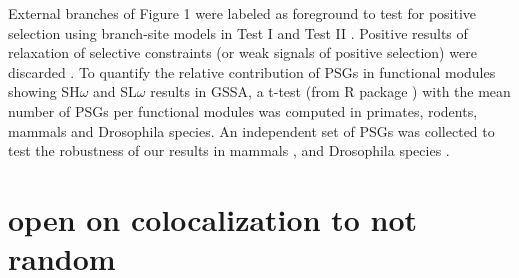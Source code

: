 External branches of Figure 1 were labeled as foreground to test for positive selection using branch-site models in Test I and Test II \cite{Zhang2005}. Positive results of relaxation of selective constraints (or weak signals of positive selection) were discarded \cite{Arbiza2006}. To quantify the relative contribution of PSGs in functional modules showing SH$\omega$ and SL$\omega$ results in GSSA, a t-test (from R package \cite{Ihaka1996}) with the mean number of PSGs per functional modules was computed in primates, rodents, mammals and Drosophila species. An independent set of PSGs was collected to test the robustness of our results in mammals \cite{Kosiol2008a}, and Drosophila species \cite{Clark2007}.


\section{open on colocalization to not random}

